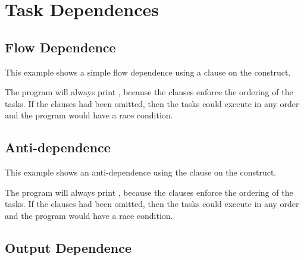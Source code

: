 \section{Task Dependences}
\label{sec:task_depend}

\subsection{Flow Dependence}
\label{subsec:task_flow_depend}

This example shows a simple flow dependence using a  
clause on the  construct.



The program will always print , because the  
clauses enforce the ordering of the tasks. If the  clauses had been 
omitted, then the tasks could execute in any order and the program
would have a race condition.

\subsection{Anti-dependence}
\label{subsec:task_anti_depend}

This example shows an anti-dependence using the  
clause on the  construct.



The program will always print , because the  
clauses enforce the ordering of the tasks. If the  clauses had been 
omitted, then the tasks could execute in any order and the program would have a 
race condition.

\subsection{Output Dependence}
\label{subsec:task_out_depend}

